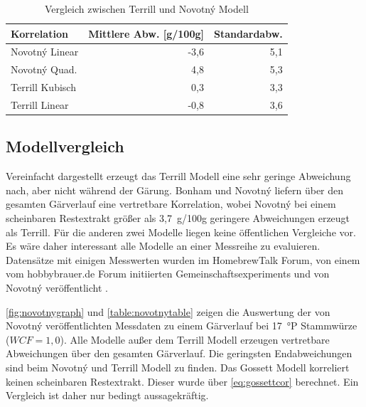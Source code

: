 \documentclass[a4paper,parskip=half]{scrartcl}
\newcommand{\wcf}{\mathit{WCF}}
\begin{document}
\begin{table}[h]
\centering
\begin{tabular}{lrr}
\toprule
Korrelation &  Mittlere Abw. [g/100g] &  Standardabw. \\
\midrule
Novotný Linear & -3,6 & 5,1 \\
Novotný Quad. & 4,8 & 5,3  \\
Terrill Kubisch & 0,3 & 3,3 \\
Terrill Linear & -0,8 & 3,6 \\
\bottomrule
\end{tabular}
\caption{Vergleich zwischen Terrill und Novotný Modell}
\label{table:terrillnovotnycomp}
\end{table}

\subsection*{Modellvergleich}

Vereinfacht dargestellt erzeugt das Terrill Modell eine sehr geringe
Abweichung nach, aber nicht während der Gärung. Bonham und Novotný
liefern über den gesamten Gärverlauf eine vertretbare Korrelation,
wobei Novotný bei einem scheinbaren Restextrakt größer als 3,7~g/100g
geringere Abweichungen erzeugt als Terrill. Für die anderen zwei Modelle
liegen keine öffentlichen Vergleiche vor. Es wäre daher interessant
alle Modelle an einer Messreihe zu evaluieren. Datensätze mit einigen
Messwerten wurden im HomebrewTalk Forum, von einem vom hobbybrauer.de Forum
initiierten Gemeinschaftsexperiments und von Novotný veröffentlicht
\autocite{Novotny2017a,Katman2019,Wolf2015}.

\autoref{fig:novotnygraph} und \autoref{table:novotnytable} zeigen die
Auswertung der von Novotný veröffentlichten Messdaten zu einem
Gärverlauf bei 17~°P Stammwürze ($\wcf = 1,0$). Alle Modelle außer dem
Terrill Modell erzeugen vertretbare Abweichungen über den gesamten
Gärverlauf. Die geringsten Endabweichungen sind beim Novotný und Terrill
Modell zu finden. Das Gossett Modell korreliert keinen scheinbaren Restextrakt.
Dieser wurde über \autoref{eq:gossettcor} berechnet. Ein Vergleich
ist daher nur bedingt aussagekräftig.
\end{document}
